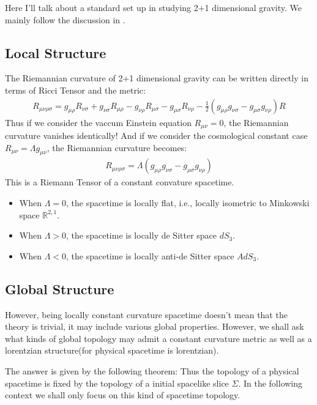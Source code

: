 Here I'll talk about a standard set up in studying 2+1 dimensional
gravity. We mainly follow the discussion in \cite{Carlip:1998qg}.

\subsection{Local Structure}

The Riemannian curvature of 2+1 dimensional gravity can be written
directly in terms of Ricci Tensor and the metric:
\begin{align}
  R_{\mu\nu\rho\sigma}=g_{\mu\rho}R_{\nu\sigma}+g_{\nu\sigma}R_{\mu\rho}-g_{\nu\rho}R_{\mu\sigma}-g_{\mu\sigma}R_{\nu\rho}-\frac{1}{2}(g_{\mu\rho}g_{\nu\sigma}-g_{\mu\sigma}g_{\nu\rho})R
\end{align}
Thus if we consider the vaccum Einstein equation $R_{\mu\nu}=0$, the
Riemannian curvature vanishes identically! And if we consider the
cosmological constant case $R_{\mu\nu}=\Lambda g_{\mu\nu}$, the
Riemannian curvature becomes:
\begin{align}
  R_{\mu\nu\rho\sigma}=\Lambda(g_{\mu\rho}g_{\nu\sigma}-g_{\mu\sigma}g_{\nu\rho})
\end{align}
This is a Riemann Tensor of a constant convature spacetime.
\begin{itemize}
  \item When $\Lambda=0$, the spacetime is locally flat, i.e.,
    locally isometric to Minkowski space $\mathbb{R}^{2,1}$.
  \item When $\Lambda>0$, the spacetime is locally de Sitter space $dS_3$.
  \item When $\Lambda<0$, the spacetime is locally anti-de Sitter space $AdS_3$.
\end{itemize}

\subsection{Global Structure}

However, being locally constant curvature spacetime doesn't mean that
the theory is trivial, it may include various global properties.
However, we shall ask what kinds of global topology may admit a
constant curvature metric as well as a lorentzian structure(for
physical spacetime is lorentzian).

The answer is given by the following theorem:
Thus the topology of a physical spacetime is fixed by the topology of
a initial spacelike slice $ \Sigma $. In the following context we
shall only focus on this kind of spacetime topology.

